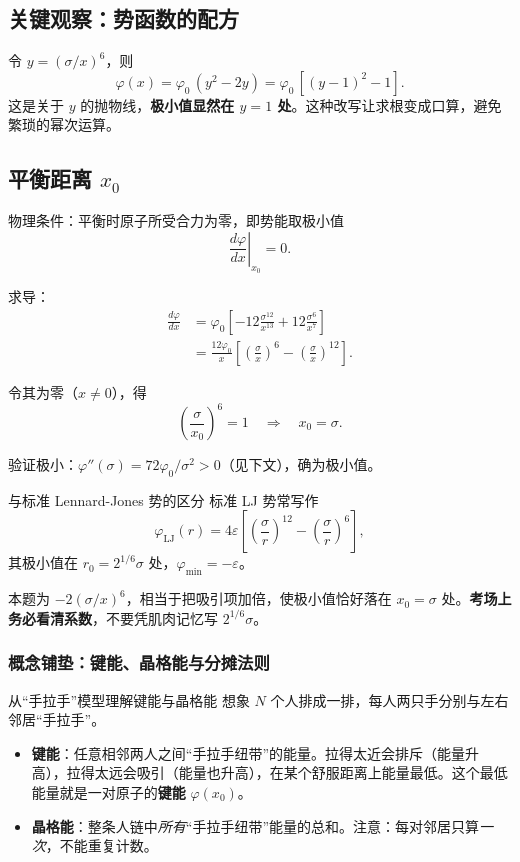 \subsection{关键观察：势函数的配方}

令 $y = (\sigma/x)^6$，则
\[
  \varphi(x) = \varphi_0\,(y^2 - 2y) = \varphi_0\,[(y-1)^2 - 1].
\]
这是关于 $y$ 的抛物线，\textbf{极小值显然在 $y=1$ 处}。这种改写让求根变成口算，避免繁琐的幂次运算。

\subsection{平衡距离 $x_0$}

物理条件：平衡时原子所受合力为零，即势能取极小值
\[
  \left.\frac{d\varphi}{dx}\right|_{x_0} = 0.
\]

求导：
\begin{align*}
  \frac{d\varphi}{dx}
  &= \varphi_0 \left[ -12\frac{\sigma^{12}}{x^{13}} + 12\frac{\sigma^6}{x^7} \right] \\
  &= \frac{12\varphi_0}{x} \left[ \left(\frac{\sigma}{x}\right)^6 - \left(\frac{\sigma}{x}\right)^{12} \right].
\end{align*}

令其为零（$x\neq 0$），得
\[
  \left(\frac{\sigma}{x_0}\right)^6 = 1 \quad\Longrightarrow\quad \boxed{x_0 = \sigma}.
\]

验证极小：$\varphi''(\sigma) = 72\varphi_0/\sigma^2 > 0$（见下文），确为极小值。

\begin{tipbox}{与标准 Lennard-Jones 势的区分}
标准 LJ 势常写作
\[
  \varphi_{\text{LJ}}(r) = 4\varepsilon\left[\left(\frac{\sigma}{r}\right)^{12} - \left(\frac{\sigma}{r}\right)^6\right],
\]
其极小值在 $r_0 = 2^{1/6}\sigma$ 处，$\varphi_{\min} = -\varepsilon$。

本题为 $-2(\sigma/x)^6$，相当于把吸引项加倍，使极小值恰好落在 $x_0 = \sigma$ 处。\textbf{考场上务必看清系数}，不要凭肌肉记忆写 $2^{1/6}\sigma$。
\end{tipbox}

\subsubsection*{概念铺垫：键能、晶格能与分摊法则}

\begin{insightbox}{从``手拉手''模型理解键能与晶格能}
想象 $N$ 个人排成一排，每人两只手分别与左右邻居``手拉手''。
\begin{itemize}[nosep]
  \item \textbf{键能}：任意相邻两人之间``手拉手纽带''的能量。拉得太近会排斥（能量升高），拉得太远会吸引（能量也升高），在某个舒服距离上能量最低。这个最低能量就是一对原子的\textbf{键能} $\varphi(x_0)$。
  \item \textbf{晶格能}：整条人链中\emph{所有}``手拉手纽带''能量的总和。注意：每对邻居只算\emph{一次}，不能重复计数。
\end{itemize}
\end{insightbox}


